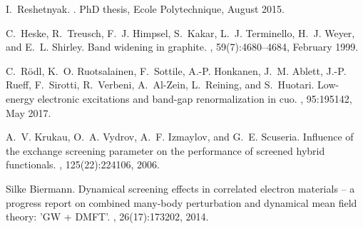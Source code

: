 \documentclass[aps,prb,10pt,showpacs,superscriptaddress,twocolumn,notitlepage]{revtex4-1}
\begin{document}
\begin{thebibliography}{10}
I.~Reshetnyak.
.
\newblock PhD thesis, Ecole Polytechnique, August 2015.

C.~Heske, R.~Treusch, F.~J. Himpsel, S.~Kakar, L.~J. Terminello, H.~J. Weyer,
  and E.~L. Shirley.
\newblock Band widening in graphite.
, 59(7):4680--4684, February 1999.

C.~R{\"o}dl, K.~O. Ruotsalainen, F.~Sottile, A.-P. Honkanen, J.~M. Ablett,
  J.-P. Rueff, F.~Sirotti, R.~Verbeni, A.~Al-Zein, L.~Reining, and S.~Huotari.
\newblock Low-energy electronic excitations and band-gap renormalization in
  cuo.
, 95:195142, May 2017.

A.~V. Krukau, O.~A. Vydrov, A.~F. Izmaylov, and G.~E. Scuseria.
\newblock Influence of the exchange screening parameter on the performance of
  screened hybrid functionals.
, 125(22):224106, 2006.

Silke Biermann.
\newblock Dynamical screening effects in correlated electron materials -- a
  progress report on combined many-body perturbation and dynamical mean field
  theory: {'GW + DMFT'}.
, 26(17):173202, 2014.

\end{thebibliography}
\end{document}
